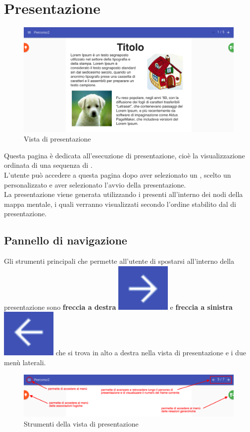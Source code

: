 \section{Presentazione} \label{pres}
\begin{figure}[H]
\centering
\includegraphics[scale=0.32]{immagini/presentazione.pdf}
\caption{Vista di presentazione}
\end{figure}
Questa pagina è dedicata all'esecuzione di presentazione, cioè la visualizzazione ordinata di una sequenza di .\\
L'utente può accedere a questa pagina dopo aver selezionato un , scelto un  personalizzato e aver selezionato l'avvio della presentazione. \\
La presentazione viene generata utilizzando i  presenti all'interno dei nodi della mappa mentale, i quali verranno visualizzati secondo l'ordine stabilito dal  di presentazione.
\subsection{Pannello di navigazione}
Gli strumenti principali che permette all'utente di spostarsi all'interno della presentazione sono \textbf{freccia a destra} \includegraphics[scale=0.5]{immagini/frecciaDestra.pdf} e \textbf{freccia a sinistra} \includegraphics[scale=0.5]{immagini/frecciaSinistra.pdf} che si trova in alto a destra nella vista di presentazione e i due menù laterali.
\begin{figure}[H]
\centering
\includegraphics[scale=0.32]{immagini/imgFrecciePres.pdf}
\caption{Strumenti della vista di presentazione}
\end{figure}
